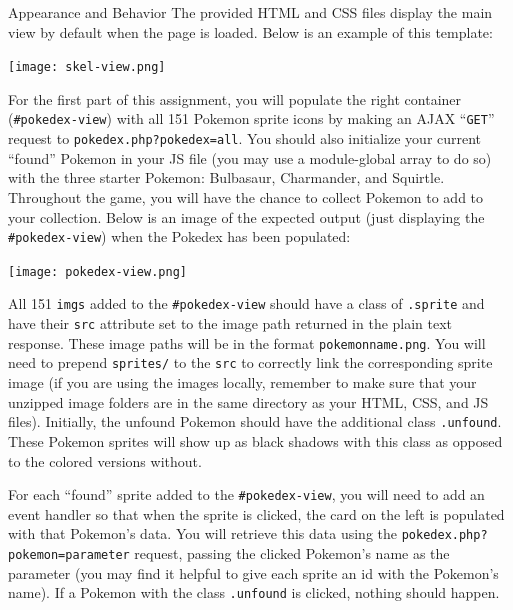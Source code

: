 \documentclass[programming]{../../../../mfcs}
\begin{document}
\begin{question}{Appearance and Behavior}
  \vspace{0.5em}
  The provided HTML and CSS files display the main view by default when the page
  is loaded. Below is an example of this template:

  \begin{center}
  \texttt{[image: skel-view.png]}
  \end{center}

  For the first part of this assignment, you will
  populate the right container (\texttt{\#pokedex-view}) with all 151 Pokemon sprite icons by making an AJAX ``\texttt{GET}'' request to \texttt{pokedex.php?pokedex=all}. You should also initialize your 
  current ``found'' Pokemon in your JS file (you may use a module-global array to do so) with the 
  three starter Pokemon: Bulbasaur, Charmander, and Squirtle. Throughout the game, you will have the 
  chance to collect Pokemon to add to your collection. Below is an image of the expected output (just 
  displaying the \texttt{\#pokedex-view}) when the Pokedex has been populated:
  \newline
  \begin{center}
  \texttt{[image: pokedex-view.png]}
  \end{center}

  All 151 \texttt{imgs} added to the \texttt{\#pokedex-view} should have a class of
  \texttt{.sprite} and have their \texttt{src} attribute set to the image path returned in the plain
  text response. These image paths will be in the format \texttt{pokemonname.png}. You will need to prepend
  \texttt{sprites/} to the \texttt{src} to correctly link the corresponding sprite
  image (if you are using the images locally, remember to make sure that your
  unzipped image folders are in the same directory as your HTML, CSS, and
  JS files). Initially, the unfound Pokemon should have the additional class \texttt{.unfound}. 
  These Pokemon sprites will show up as black shadows with this class as opposed to the colored
  versions without.
  \newline

  For each ``found'' sprite added to the \texttt{\#pokedex-view}, you will need to add an event handler so
  that when the sprite is clicked, the card on the left is populated with that Pokemon's data. You
  will retrieve this data using the \texttt{pokedex.php?pokemon=parameter} request, passing the clicked
  Pokemon's name as the parameter (you may find it helpful to give each sprite an id with the
  Pokemon's name). If a Pokemon with the class \texttt{.unfound} is
  clicked, nothing should happen.
  \newline


\end{question}
\end{document}
